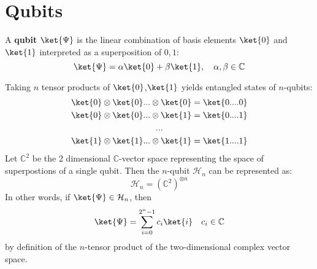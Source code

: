 \section{Qubits}

A {\bf qubit} $\ket{\Psi}$ is the linear combination of basis elements $\ket{0}$ and $\ket{1}$ interpreted as a superposition of $0,1$:
$$ \ket{\Psi} = \alpha \ket{0} + \beta \ket{1}, \quad \alpha,\beta \in \mathbb{C}$$

Taking $n$ tensor products of $\ket{0}$,$\ket{1}$ yields entangled states of $n$-qubits:
\begin{gather*}
  \ket{0} \otimes \ket{0} ... \otimes \ket{0} = \ket{0....0} \\   \ket{0} \otimes \ket{0} ... \otimes \ket{1} = \ket{0....1} \\
  ... \\
    \ket{1} \otimes \ket{1} ... \otimes \ket{1} = \ket{1....1}
\end{gather*}
Let $\mathbb{C}^2$ be the 2 dimensional $\mathbb{C}$-vector space representing the space of superpostions of a single qubit. Then the $n$-qubit $\mathcal{H}_n$ can be represented as:
$$\mathcal{H}_n = (\mathbb{C}^2)^{\otimes n}  $$ In other words, if $\ket{\Psi} \in \mathcal{H}_n$, then
$$ \ket{\Psi} = \sum_{i= 0}^{2^n -1} c_i \ket{i} \quad c_i \in \mathbb{C} $$
by definition of the $n$-tensor product of the two-dimensional complex vector space.
